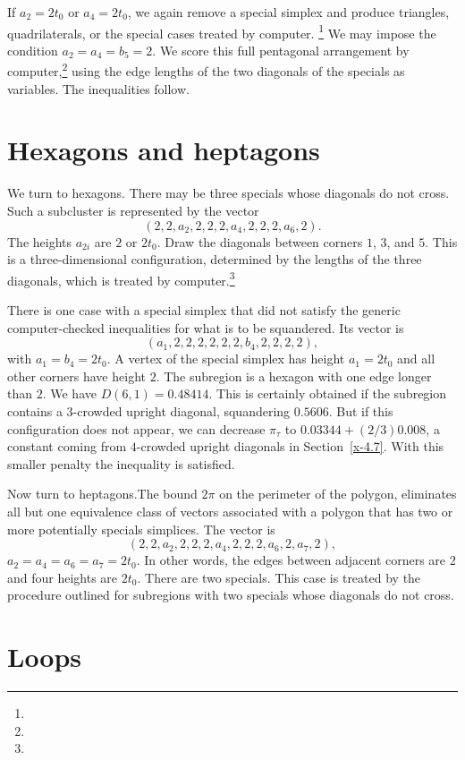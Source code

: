 If $a_2=2t_0$ or $a_4=2t_0$, we again remove a special simplex and
produce triangles, quadrilaterals, or the special cases treated
by computer.%
\footnote{} %
We may impose the condition $a_2=a_4=b_5=2$. We score this full pentagonal
arrangement by computer,\footnote{} %
using the edge lengths of the two diagonals of
the specials as variables. The inequalities follow.

\section{Hexagons and heptagons} %

We turn to hexagons. There may be three specials whose diagonals do not
cross.  Such a subcluster is represented by the vector
    $$(2,2,a_2,2,2,2,a_4,2,2,2,a_6,2).$$
The heights $a_{2i}$ are $2$ or $2t_0$.  Draw the diagonals between
corners $1$, $3$, and $5$.  This is a three-dimensional configuration,
determined by the lengths of the three diagonals, which is treated
by computer.\footnote{} %

There is one case with a special simplex that
did not satisfy the generic computer-checked inequalities for
what is to be squandered.  Its vector is
    $$(a_1,2,2,2,2,2,2,b_4,2,2,2,2),$$
with $a_1=b_4=2t_0$. A vertex of the special simplex has height
$a_1=2t_0$ and all other corners have height $2$.  The subregion
is a hexagon with one edge longer than $2$.  We have $D(6,1)=
0.48414$. This is certainly obtained if the subregion contains a
$3$-crowded upright diagonal, squandering $0.5606$. But if this
configuration does not appear, we can decrease $\pi_\tau$ to
    $0.03344 + (2/3) 0.008$,
a constant coming from $4$-crowded upright diagonals in
Section~\ref{x-4.7}. With this smaller penalty the inequality is
satisfied.

Now turn to heptagons.The bound $2\pi$  on the perimeter of the polygon,
eliminates all but one equivalence class of vectors associated with a
polygon that has two or more potentially specials simplices. The vector
is
    $$(2,2,a_2,2,2,2,a_4,2,2,2,a_6,2,a_7,2),$$
$a_2=a_4=a_6=a_7=2t_0$. In other words, the edges between adjacent
corners are $2$ and four heights are $2t_0$. There are two specials.
This case is treated by the procedure outlined for subregions with two
specials whose diagonals do not cross.

\section{Loops} %
    \label{sec:loops}

